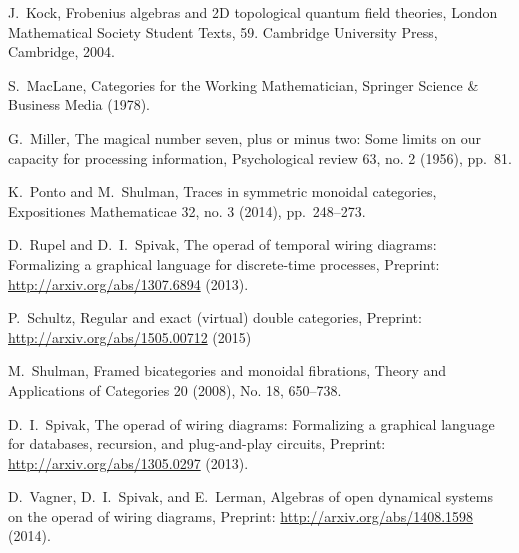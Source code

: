 \documentclass[11pt,oneside,article]{memoir}
\begin{document}
\begin{thebibliography}{XXX}
 J.~Kock, Frobenius algebras and 2D topological quantum field theories, London Mathematical Society Student Texts, 59. Cambridge University Press, Cambridge, 2004.

 S.~MacLane, Categories for the Working Mathematician, Springer Science \& Business Media (1978).

 G.~Miller, The magical number seven, plus or minus two: Some limits on our capacity for processing information, Psychological review 63, no. 2 (1956), pp.~81.

 K.~Ponto and M.~Shulman, Traces in symmetric monoidal categories, Expositiones Mathematicae 32, no. 3 (2014), pp.~248--273.

 D.~Rupel and D.~I.~Spivak, The operad of temporal wiring diagrams: Formalizing a graphical language for discrete-time processes, Preprint: \url{http://arxiv.org/abs/1307.6894} (2013).

 P.~Schultz, Regular and exact (virtual) double categories, Preprint: \url{http://arxiv.org/abs/1505.00712} (2015)

 M.~Shulman, Framed bicategories and monoidal fibrations, Theory and Applications of Categories 20 (2008), No. 18, 650--738.

 D.~I.~Spivak, The operad of wiring diagrams: Formalizing a graphical language for databases, recursion, and plug-and-play circuits, Preprint: \url{http://arxiv.org/abs/1305.0297} (2013).

 D.~Vagner, D.~I.~Spivak, and E.~Lerman, Algebras of open dynamical systems on the operad of wiring diagrams, Preprint: \url{http://arxiv.org/abs/1408.1598} (2014).

\end{thebibliography}
\end{document}
